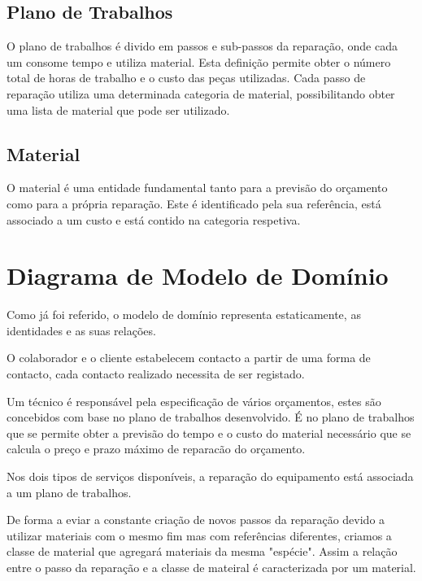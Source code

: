 \documentclass[a4paper,12pt]{scrreprt}
\begin{document}
\subsection{Plano de Trabalhos} \label{ent_plano-de-trabalhos}
O plano de trabalhos é divido em passos e sub-passos da reparação, onde cada um consome tempo e utiliza material. 
Esta definição permite obter o número total de horas de trabalho e o custo das peças utilizadas. 
Cada passo de reparação utiliza uma determinada categoria de material, possibilitando obter uma lista de material que pode ser utilizado.

\subsection{Material} \label{ent_material}
O material é uma entidade fundamental tanto para a previsão do orçamento como para a própria reparação.
Este é identificado pela sua referência, está associado a um custo e está contido na categoria respetiva.

\section{Diagrama de Modelo de Domínio}
Como já foi referido, o modelo de domínio representa estaticamente, as identidades e as suas relações. 

O colaborador e o cliente estabelecem contacto a partir de uma forma de contacto, cada contacto realizado necessita de ser registado.

Um técnico é responsável pela especificação de vários orçamentos, estes são concebidos com base no plano de trabalhos desenvolvido. É no plano de trabalhos que se 
permite obter a previsão do tempo e o custo do material necessário que se calcula o preço e prazo máximo de reparacão do orçamento. 

Nos dois tipos de serviços disponíveis, a reparação do equipamento está associada a um plano de trabalhos. %

De forma a eviar a constante criação de novos passos da reparação devido a utilizar materiais com o mesmo fim mas com referências diferentes, criamos a classe
de material que agregará materiais da mesma "espécie". Assim a relação entre o passo da reparação e a classe de mateiral é caracterizada por um material.
\end{document}
